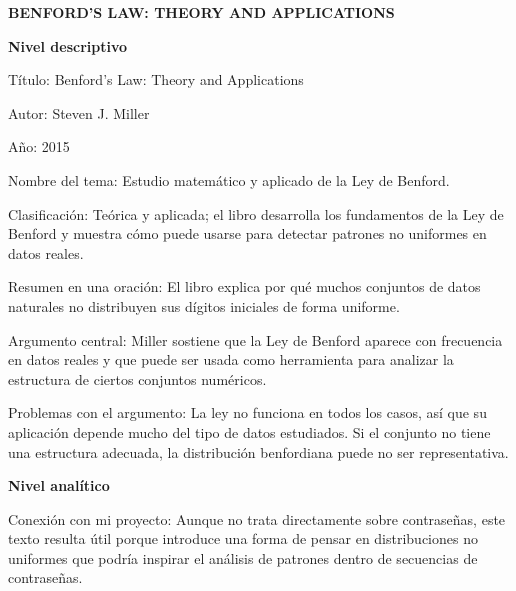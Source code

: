 \documentclass[12pt, letterpaper]{article}
\begin{document}
\begin{center}
    \vspace{0.8cm}
    {\Large \bfseries BENFORD'S LAW: THEORY AND APPLICATIONS} \\
    \vspace{0.4cm}
\end{center}

\vspace{1.5cm}

\noindent
\textbf{Nivel descriptivo} \newline

\noindent
Título: Benford's Law: Theory and Applications \newline

\noindent
Autor: Steven J. Miller \newline

\noindent
Año: 2015 \newline

\noindent
Nombre del tema: Estudio matemático y aplicado de la Ley de Benford. \newline

\noindent
Clasificación: Teórica y aplicada; el libro desarrolla los fundamentos de la Ley de Benford y muestra cómo puede usarse para detectar patrones no uniformes en datos reales.\newline

\noindent
Resumen en una oración: El libro explica por qué muchos conjuntos de datos naturales no distribuyen sus dígitos iniciales de forma uniforme. \newline

\noindent
Argumento central: Miller sostiene que la Ley de Benford aparece con frecuencia en datos reales y que puede ser usada como herramienta para analizar la estructura de ciertos conjuntos numéricos.\newline

\noindent
Problemas con el argumento: La ley no funciona en todos los casos, así que su aplicación depende mucho del tipo de datos estudiados. Si el conjunto no tiene una estructura adecuada, la distribución benfordiana puede no ser representativa.
\newpage 

\noindent
\textbf{Nivel analítico} \newline

\noindent
Conexión con mi proyecto: Aunque no trata directamente sobre contraseñas, este texto resulta útil porque introduce una forma de pensar en distribuciones no uniformes que podría inspirar el análisis de patrones dentro de secuencias de contraseñas.\newline
\end{document}
